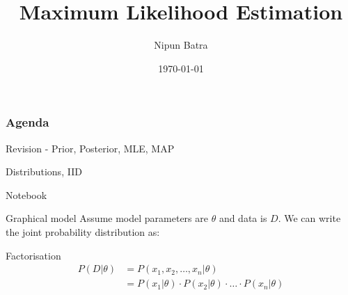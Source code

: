 \documentclass[handout]{beamer}
\begin{document}
\title{Maximum Likelihood Estimation}
\author{Nipun Batra}
\date{\today}
\maketitle
{}
\begin{frame}
    \frametitle{Agenda}
    \tableofcontents[hidesubsections]
    \end{frame}
    
\begin{section}{Revision - Prior, Posterior, MLE, MAP}
\end{section}
\begin{section}{Distributions, IID}
    \begin{frame}
        Notebook
    \end{frame}

    \begin{frame}{Graphical model}
        Assume model parameters are $\theta$ and data is $D  $. We can write the joint probability distribution as:

        
    \end{frame}

    \begin{frame}{Factorisation}
        \begin{align*}
            P(D|\theta) & = P(x_1, x_2, \ldots, x_n | \theta) \\
            & = P(x_1|\theta) \cdot P(x_2|\theta) \cdot \ldots \cdot P(x_n|\theta)
        \end{align*}
        
    \end{frame}

\end{section}
\end{document}
